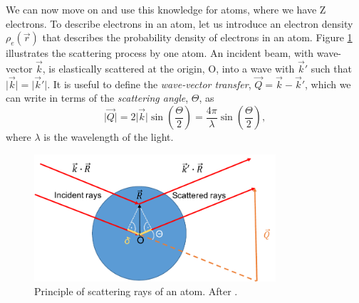 We can now move on and use this knowledge for atoms, where we have Z electrons. To describe electrons in an atom, let us introduce an electron density $\rho_{e}\left(\vec{r}\right)$ that describes the probability density of electrons in an atom. Figure \ref{fig:X-ray-scattering} illustrates the scattering process by one atom. An incident beam, with wave-vector $\vec{k}$, is elastically scattered at the origin, O, into a wave with $\vec{k}'$ such that $\lvert \vec{k}\rvert=\lvert \vec{k}'\rvert$. 
It is useful to define the \textit{wave-vector transfer}, $\vec{Q} = \vec{k}-\vec{k}'$, which we can write in terms of the \textit{scattering angle}, $\Theta$, as
\begin{equation}
\lvert \vec{Q}\rvert=2 \lvert \vec{k}\rvert \sin\left(\frac{\Theta}{2}\right)=\frac{4 \pi}{\lambda}\sin\left(\frac{\Theta}{2}\right),
\label{eq:Q-scattering-angle}
\end{equation}
where $\lambda$ is the wavelength of the light.\\[1\baselineskip]
\begin{figure}
	\centering
		\includegraphics[width=0.80\textwidth]{images/X-ray-scattering.pdf}
	\caption[Principle of scattering rays of an atom.]{Principle of scattering rays of an atom. After \citep{Als-Nielson-2011-JWS,Guinier-1955-JWS}.}
	\label{fig:X-ray-scattering}
\end{figure}
